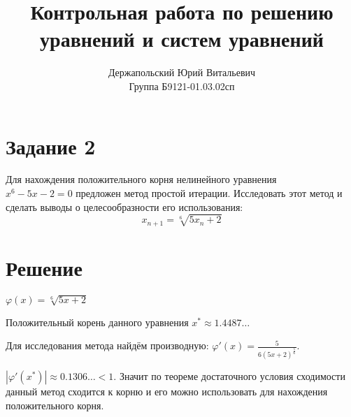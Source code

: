 \documentclass[14pt, a4paper, titlepage, fleqn]{extarticle}
\title{Контрольная работа по решению уравнений и систем уравнений}
\author{Держапольский Юрий Витальевич \\ Группа Б9121-01.03.02сп}
\date{}
\begin{document}
    \maketitle

    \section*{Задание 2}
        Для нахождения положительного корня нелинейного уравнения \\ \( x^6 -5x - 2 = 0 \)  предложен метод простой итерации. Исследовать этот метод и сделать выводы о целесообразности его использования:
        \[ x_{n+1} = \sqrt[6]{5x_n+2} \]

    \section*{Решение}
        \( \varphi(x) = \sqrt[6]{5x+2} \)

        Положительный корень данного уравнения \( x^* \approx 1.4487\dots \)

        Для исследования метода найдём производную: \( \varphi'(x) = \frac{5}{6 (5x + 2)^{\frac{5}{6}}} \).

        \( | \varphi'(x^*) | \approx 0.1306\ldots < 1 \). Значит по теореме достаточного условия сходимости данный метод сходится к корню и его можно использовать для нахождения положительного корня. 
\end{document}
